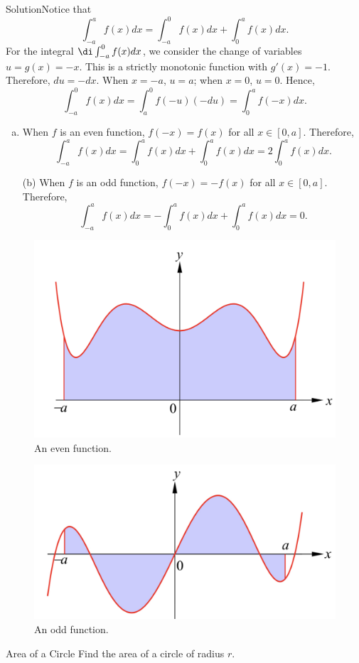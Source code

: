 \begin{example}[label=20230527]{}
\begin{example}
\begin{enumerate}[(a)]
\end{enumerate}
\end{example}
\begin{solution}{Solution}Notice that
\[\int_{-a}^af(x)dx=\int_{-a}^0f(x)dx+\int_0^af(x)dx.\]For the   integral 
$\di \int_{-a}^0f(x)dx$, 
we consider the change of variables $u=g(x)= -x$. This is a strictly monotonic function with $g'(x)=-1$. Therefore, $du=-dx$. When $x=-a$, $u=a$; when $x=0$, $u=0$. Hence,
\[\int^0_{-a}f(x)dx= \int_a^0f(-u)(-du)=\int_0^af(-x)dx.\] 
\begin{enumerate}[(a)]
\item
When $f$ is an even function, $f(-x)=f(x)$ for all $x\in [0,a]$. Therefore,
\[\int_{-a}^af(x)dx= \int_0^af(x)dx+\int_0^af(x)dx=2\int_0^af(x)dx.\]
\item[(b)] When  $f$ is an odd function, $f(-x)=-f(x)$ for all $x\in [0,a]$. Therefore,
\[\int_{-a}^af(x)dx= -\int_0^af(x)dx+\int_0^af(x)dx=0.\]
\end{enumerate}
\end{solution}

\begin{figure}[ht]
\centering
\includegraphics[scale=0.2]{Picture46.png}
\caption{An even function.\fa}\label{figure46}
\end{figure}

\begin{figure}[ht]
\centering
\includegraphics[scale=0.2]{Picture47.png}
\caption{An odd function.\fa}\label{figure47}
\end{figure}
\begin{example}{Area of a Circle}
 Find the area of a circle of radius $r$.


\end{example}
\end{example}
